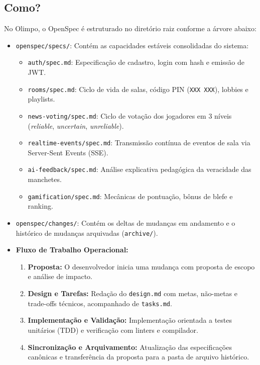 \documentclass[12pt,a4paper]{article}
\begin{document}
\subsection{Como?}
No Olimpo, o OpenSpec é estruturado no diretório raiz conforme a árvore abaixo:
\begin{itemize}
  \item \texttt{openspec/specs/}: Contém as capacidades estáveis consolidadas do sistema:
  \begin{itemize}
    \item \texttt{auth/spec.md}: Especificação de cadastro, login com hash e emissão de JWT.
    \item \texttt{rooms/spec.md}: Ciclo de vida de salas, código PIN (\texttt{XXX XXX}), lobbies e playlists.
    \item \texttt{news-voting/spec.md}: Ciclo de votação dos jogadores em 3 níveis (\textit{reliable}, \textit{uncertain}, \textit{unreliable}).
    \item \texttt{realtime-events/spec.md}: Transmissão contínua de eventos de sala via Server-Sent Events (SSE).
    \item \texttt{ai-feedback/spec.md}: Análise explicativa pedagógica da veracidade das manchetes.
    \item \texttt{gamification/spec.md}: Mecânicas de pontuação, bônus de blefe e ranking.
  \end{itemize}
  \item \texttt{openspec/changes/}: Contém os deltas de mudanças em andamento e o histórico de mudanças arquivadas (\texttt{archive/}).
  \item \textbf{Fluxo de Trabalho Operacional:}
  \begin{enumerate}
    \item \textbf{Proposta:} O desenvolvedor inicia uma mudança com proposta de escopo e análise de impacto.
    \item \textbf{Design e Tarefas:} Redação do \texttt{design.md} com metas, não-metas e trade-offs técnicos, acompanhado de \texttt{tasks.md}.
    \item \textbf{Implementação e Validação:} Implementação orientada a testes unitários (TDD) e verificação com linters e compilador.
    \item \textbf{Sincronização e Arquivamento:} Atualização das especificações canônicas e transferência da proposta para a pasta de arquivo histórico.
  \end{enumerate}
\end{itemize}
\end{document}
